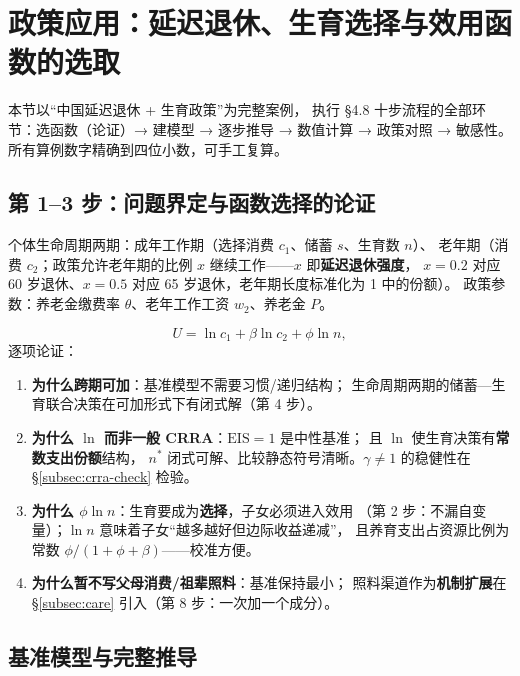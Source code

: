 \section{政策应用：延迟退休、生育选择与效用函数的选取}

本节以“中国延迟退休 + 生育政策”为完整案例，
执行 §4.8 十步流程的全部环节：选函数（论证）→ 建模型 → 逐步推导
→ 数值计算 → 政策对照 → 敏感性。所有算例数字精确到四位小数，可手工复算。

\subsection{第 1--3 步：问题界定与函数选择的论证}

个体生命周期两期：成年工作期（选择消费 $c_1$、储蓄 $s$、生育数 $n$）、
老年期（消费 $c_2$；政策允许老年期的比例 $x$ 继续工作——$x$ 即\textbf{延迟退休强度}，
$x=0.2$ 对应 60 岁退休、$x=0.5$ 对应 65 岁退休，老年期长度标准化为 1 中的份额）。
政策参数：养老金缴费率 $\theta$、老年工作工资 $w_2$、养老金 $P$。

\[
U=\ln c_1+\beta\ln c_2+\phi\ln n,
\]
逐项论证：
\begin{enumerate}
  \item \textbf{为什么跨期可加}：基准模型不需要习惯/递归结构；
        生命周期两期的储蓄—生育联合决策在可加形式下有闭式解（第 4 步）。
  \item \textbf{为什么 $\ln$ 而非一般 CRRA}：$\mathrm{EIS}=1$ 是中性基准；
        且 $\ln$ 使生育决策有\textbf{常数支出份额}结构，
        $n^*$ 闭式可解、比较静态符号清晰。$\gamma\ne1$ 的稳健性在 §\ref{subsec:crra-check} 检验。
  \item \textbf{为什么 $\phi\ln n$}：生育要成为\textbf{选择}，子女必须进入效用
        （第 2 步：不漏自变量）；$\ln n$ 意味着子女“越多越好但边际收益递减”，
        且养育支出占资源比例为常数 $\phi/(1+\phi+\beta)$——校准方便。
  \item \textbf{为什么暂不写父母消费/祖辈照料}：基准保持最小；
        照料渠道作为\textbf{机制扩展}在 §\ref{subsec:care} 引入（第 8 步：一次加一个成分）。
\end{enumerate}

\subsection{基准模型与完整推导}\label{subsec:baseline}

